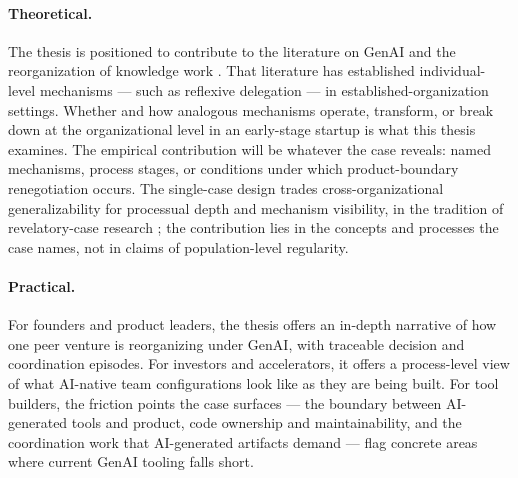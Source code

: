 \documentclass[11pt,a4paper]{article}
\begin{document}
\paragraph{Theoretical.} The thesis is positioned to contribute to the literature on GenAI and the reorganization of knowledge work \citep{clarke2025beyond,law2025generative,mayer2025generation,ulloa2025product}. That literature has established individual-level mechanisms --- such as reflexive delegation --- in established-organization settings. Whether and how analogous mechanisms operate, transform, or break down at the organizational level in an early-stage startup is what this thesis examines. The empirical contribution will be whatever the case reveals: named mechanisms, process stages, or conditions under which product-boundary renegotiation occurs. The single-case design trades cross-organizational generalizability for processual depth and mechanism visibility, in the tradition of revelatory-case research \citep{yin2018case,langley2013process}; the contribution lies in the concepts and processes the case names, not in claims of population-level regularity.

\paragraph{Practical.} For founders and product leaders, the thesis offers an in-depth narrative of how one peer venture is reorganizing under GenAI, with traceable decision and coordination episodes. For investors and accelerators, it offers a process-level view of what AI-native team configurations look like as they are being built. For tool builders, the friction points the case surfaces --- the boundary between AI-generated tools and product, code ownership and maintainability, and the coordination work that AI-generated artifacts demand --- flag concrete areas where current GenAI tooling falls short.

\end{document}
